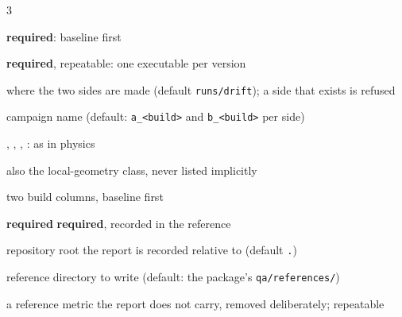 \begin{multicols}{3}
\begin{flags}
\end{flags}
\begin{flags}
\item {} \textbf{required}: baseline first
\item {} \textbf{required}, repeatable: one executable per version
\item {} where the two sides are made (default \texttt{runs/drift}); a side that exists is refused
\item {} campaign name (default: \texttt{a\_<build>} and \texttt{b\_<build>} per side)
\item {}, , , : as in physics
\end{flags}
\begin{flags}
\item {} also the local-geometry class, never listed implicitly
\end{flags}
\begin{flags}
\item {} two build columns, baseline first
\end{flags}
\begin{flags}
\item {} \textbf{required} \quad {} \textbf{required}, recorded in the reference
\item {} repository root the report is recorded relative to (default \texttt{.})
\item {} reference directory to write (default: the package's \texttt{qa/references/})
\item {} a reference metric the report does not carry, removed deliberately; repeatable
\end{flags}


\end{multicols}
